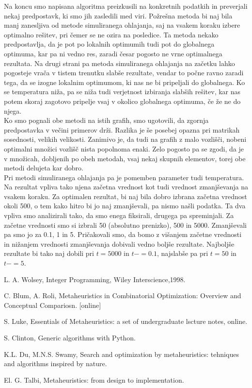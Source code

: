 \documentclass[12pt,a4paper]{amsart}
\theoremstyle{definition} %
\theoremstyle{plain} %
\begin{document}
Na koncu smo napisana algoritma preizkusili na konkretnih podatkih in preverjali nekaj predpostavk, ki smo jih zasledili med viri. Požrešna metoda bi naj bila manj zanesljiva od metode simuliranega ohlajanja, saj na vsakem koraku izbere optimalno rešitev, pri čemer se ne ozira na posledice. Ta metoda nekako predpostavlja, da je pot po lokalnih optimumih tudi pot do globalnega optimuma, kar pa ni vedno res, zaradi česar pogosto ne vrne optimalnega rezultata. Na drugi strani pa metoda simuliranega ohlajanja na začetku lahko pogosteje vrača v tistem trenutku slabše rezultate, vendar to počne ravno zaradi tega, da se izogne lokalnim optimumom, ki nas ne bi pripeljali do globalnega. Ko se temperatura niža, pa se niža tudi verjetnost izbiranja slabših rešitev, kar nas potem skoraj zagotovo pripelje vsaj v okolico globalnega optimuma, če že ne do njega. \\
Ko smo pognali obe metodi na istih grafih, smo ugotovili, da zgornja predpostavka v večini primerov drži. Razlika je še posebej opazna pri matrikah sosednosti, velikih velikosti. Zanimivo je, da tudi na grafih z malo vozlišči, nobeni optimalni množici vozlišč nista popolnoma enaki. Zelo pogosto pa se zgodi, da je v množicah, dobljenih po obeh metodah, vsaj nekaj skupnih elementov, torej obe metodi delujeta kar dobro. \\
Pri metodi simuliranega ohlajanja pa je pomemben parameter tudi temperatura. Na rezultat vpliva tako njena začetna vrednost kot tudi vrednost zmanjševanja na vsakem koraku. Za optimalen rezultat, bi naj bila dobro izbrana začetna vrednost okoli 500, o tem kako hitro bi jo naj zmanjševali, pa nismo našli podatka. Ta dva vpliva smo analizirali tako, da smo enega fiksirali, drugega pa spreminjali. Za začetne vrednosti smo si izbrali 50 (absolutno prenizko), 500 in 5000. Zmanjševali pa smo jo za 0.1, 1 in 5. Pričakovali smo, da bomo z višanjem začetne vrednosti in nižanjem vrednosti zmanjševanja dobivali vedno boljše rezultate. Najboljše rezultate bi tako naj dobili pri $t=5000$ in $t -=0.1$, najslabše pa pri $t=50$ in $t -=5$.

\newpage

\begin{thebibliography}{9}
L. A. Wolsey, Integer Programming, Wiley Interscience,1998. 

 
C. Blum, A. Roli, Metaheuristics in Combinatorial Optimization: Overview and Conceptual Compariosn. [online]
 
S. Luke, Essentials of Metaheuristics: a set of undergraduate lscture notes, online. 

S. Clinton, Generic algorithms with Python.

K.L. Du, M.N.S. Swamy, Search and optimization by metaheuristics: tehniques and algorithms inspired by nature. 


El. G. Talbi, Metaheuristics: from design to implementation.

\end{thebibliography}
\end{document}
